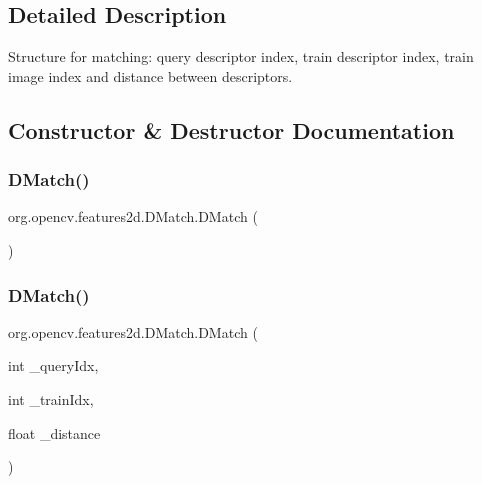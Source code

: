 \subsection{Detailed Description}
Structure for matching\+: query descriptor index, train descriptor index, train image index and distance between descriptors. 

\subsection{Constructor \& Destructor Documentation}
\mbox{\label{classorg_1_1opencv_1_1features2d_1_1_d_match_a3255866a2a9cdde50cee7159145fac42}} 
\subsubsection{\texorpdfstring{D\+Match()}{DMatch()}\hspace{0.1cm}{\footnotesize\ttfamily [1/3]}}
{\footnotesize\ttfamily org.\+opencv.\+features2d.\+D\+Match.\+D\+Match (\begin{DoxyParamCaption}{ }\end{DoxyParamCaption})}

\mbox{\label{classorg_1_1opencv_1_1features2d_1_1_d_match_a813ac78e8774f83ebd543a7e69dd00a0}} 
\subsubsection{\texorpdfstring{D\+Match()}{DMatch()}\hspace{0.1cm}{\footnotesize\ttfamily [2/3]}}
{\footnotesize\ttfamily org.\+opencv.\+features2d.\+D\+Match.\+D\+Match (\begin{DoxyParamCaption}\item[{int}]{\+\_\+query\+Idx,  }\item[{int}]{\+\_\+train\+Idx,  }\item[{float}]{\+\_\+distance }\end{DoxyParamCaption})}

